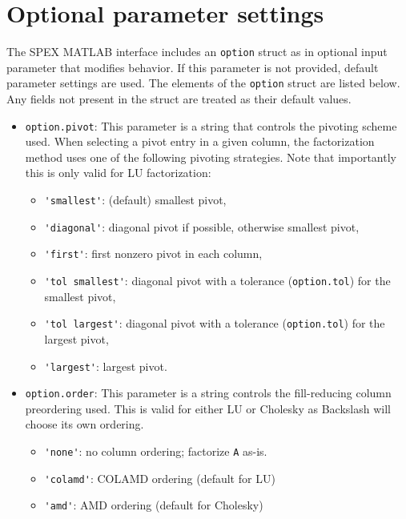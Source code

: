 \documentclass[12pt]{report}
\theoremstyle{definition}
\begin{document}
\section{Optional parameter settings}
\label{s:Use:MATLAB:setup}

The SPEX MATLAB interface includes an \verb|option| struct as in optional
input parameter that modifies behavior.  If this parameter is not provided,
default parameter settings are used.  The elements of the \verb'option' struct
are listed below.  Any fields not present in the struct are treated as their
default values.

\begin{itemize}

\item \verb|option.pivot|: This parameter is a string that controls the
pivoting scheme used.  When selecting a pivot entry in a given column, the
factorization method uses one of the following pivoting strategies. Note that
importantly this is only valid for LU factorization:

    \begin{itemize}
    \item \verb|'smallest'|: (default) smallest pivot,
    \item \verb|'diagonal'|: diagonal pivot if possible, otherwise smallest pivot,
    \item \verb|'first'|: first nonzero pivot in each column,
    \item \verb|'tol smallest'|: diagonal pivot with a tolerance (\verb|option.tol|)
        for the smallest pivot,
    \item \verb|'tol largest'|: diagonal pivot with a tolerance (\verb|option.tol|)
        for the largest pivot,
    \item \verb|'largest'|: largest pivot.
    \end{itemize}
    
\item \verb|option.order|: This parameter is a string controls the
fill-reducing column preordering used. This is valid for either LU
or Cholesky as Backslash will choose its own ordering.

    \begin{itemize}
    \item \verb|'none'|: no column ordering; factorize \verb'A' as-is.
    \item \verb|'colamd'|: COLAMD ordering (default for LU)
    \item \verb|'amd'|: AMD ordering (default for Cholesky)
    \end{itemize}


\end{itemize}
\end{document}
